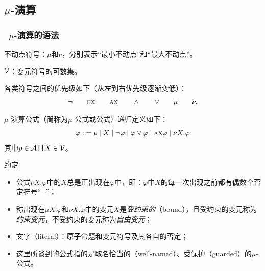 \documentclass[9pt, CJK]{beamer}
\begin{document}
\subsection{$\mu$-演算}
\begin{frame} 
	\frametitle{~$\mu$-演算的语法}
	{\footnotesize 
		不动点符号：$\mu$和$\nu$，分别表示“最小不动点”和“最大不动点”。
		
		${\cal V}$：变元符号的可数集。
		
		各类符号之间的优先级如下（从左到右优先级逐渐变低）：
		\[
		\neg\qquad \textsc{e}\textsc{x}\qquad \textsc{a}\textsc{x}\qquad \wedge\qquad \vee\qquad \mu \qquad \nu.
		\]
	\begin{definition}[$\mu$-演算公式]
		$\mu$-演算公式（简称为$\mu$-公式或公式）递归定义如下：
		\[
		\varphi ::=   p\mid  X\mid \neg \varphi\mid \varphi \vee \varphi \mid \textsc{a}\textsc{x} \varphi\mid  \nu X. \varphi
		\]
		其中$p\in {\cal A}$且$X\in {\cal V}$。
	\end{definition}
\pause
	\begin{block}{约定}
		\begin{itemize}
			\item 公式$\nu X.\varphi$中的$X$总是正出现在$\varphi$中，即：$\varphi$中$X$的每一次出现之前都有偶数个否定符号“$\neg$”；
			\item 称出现在$\mu X. \varphi$和$\nu X. \varphi$中的变元$X$是\emph{受约束的}（bound），且受约束的变元称为{\em 约束变元}，不受约束的变元称为\emph{自由变元}；
			\item 文字（literal）：原子命题和变元符号及其各自的否定；
			\item 这里所谈到的公式指的是取名恰当的（well-named）、受保护（guarded）的$\mu$-公式。
		\end{itemize}
	\end{block}
}
\end{frame}
\end{document}
